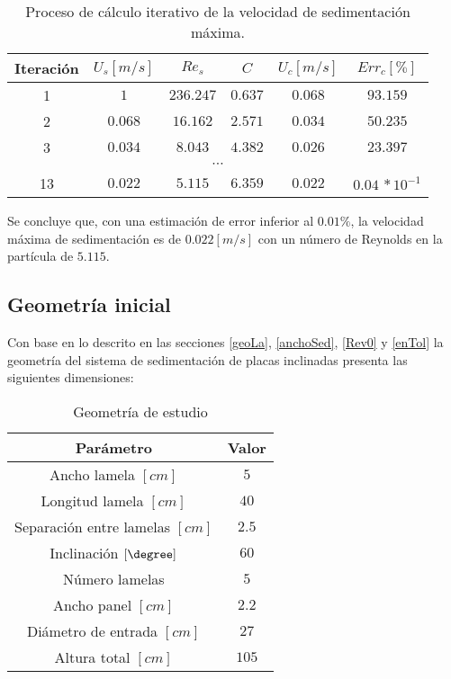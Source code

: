 \begin{table}[h!]
	\centering
	\begin{tabular}{|c|c|c|c|c|c|}
	\hline
	Iteraci\'on & $U_s [m/s]$ & $Re_s$ & $C$ & $U_c [m/s]$ & $Err_c [\%]$ \\ \hline
	1 & $1$ & $236.247$ & $0.637$ & $0.068$ & $93.159$ \\ \hline
	2 & $0.068$ & $16.162$ & $2.571$ & $0.034$ & $50.235$ \\ \hline
	3 & $0.034$ & $8.043$ & $4.382$ & $0.026$ & $23.397$ \\ \hline
	\multicolumn{6}{|c|}{$\cdots$} \\ \hline
	13 & $0.022$ & $5.115$ & $6.359$ & $0.022$ & $0.04 \, *10^{-1}$ \\ \hline	
	\end{tabular}
	\caption{Proceso de c\'alculo iterativo de la velocidad de sedimentaci\'on m\'axima.}
	\label{iteraciones}
\end{table}

\noindent
\justify

Se concluye que, con una estimaci\'on de error inferior al $0.01 \%$, la velocidad m\'axima de sedimentaci\'on es de $0.022 [m/s]$ con un n\'umero de Reynolds en la part\'icula de $5.115$.

\subsection{Geometr\'ia inicial}

\noindent
\justify

Con base en lo descrito en las secciones \ref{geoLa}, \ref{anchoSed}, \ref{Rev0} y \ref{enTol} la geometr\'ia del sistema de sedimentaci\'on de placas inclinadas presenta las siguientes dimensiones:

\begin{table}[h!]
	\centering
	\begin{tabular}{|c|c|}
		\hline
		\textbf{Par\'ametro} & \textbf{Valor} \\ \hline
			Ancho lamela $[cm]$ & $5$ \\ \hline
			Longitud lamela $[cm]$ & $40$ \\ \hline
			Separaci\'on entre lamelas $[cm]$ & $2.5$ \\ \hline
			Inclinaci\'on $[\degree]$ & $60$ \\ \hline
			N\'umero lamelas & $5$ \\ \hline
			Ancho panel $[cm]$ & $2.2$ \\ \hline
			Di\'ametro de entrada $[cm]$ & $27$ \\ \hline
			Altura total $[cm]$ & $105$ \\ \hline
	\end{tabular}
	\caption{Geometr\'ia de estudio}
	\label{GeoInicial}
\end{table}

